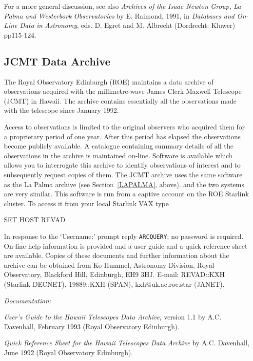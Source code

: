 \documentclass[twoside,11pt,nolof]{starlink}
\begin{document}
For a more general discussion, see also \textit{Archives of the Isaac
Newton Group, La Palma and Westerbork Observatories} by E. Raimond,
1991, in \textit{Databases and On-Line Data in Astronomy}, eds. D. Egret
and M. Albrecht (Dordrecht: Kluwer) pp115-124.

\subsection{JCMT Data Archive}

The Royal Observatory Edinburgh (ROE) maintains a data archive of
observations acquired with the millimetre-wave James Clerk Maxwell
Telescope (JCMT) in Hawaii. The archive contains essentially all the
observations made with the telescope since January 1992.

Access to observations is limited to the original observers who acquired
them for a proprietary period of one year. After this period has
elapsed the observations become publicly available. A catalogue
containing summary details of all the observations in the archive is
maintained on-line. Software is available which allows you to
interrogate this archive to identify observations of interest and to
subsequently request copies of them. The JCMT archive uses the same
software as the La Palma archive (see Section~\ref{LAPALMA}, above),
and the two systems are very similar. This software is run from a
captive account on the ROE Starlink cluster. To access it from your
local Starlink VAX type

\begin{terminalv}
    SET  HOST  REVAD
\end{terminalv}

In response to the `Username:' prompt reply \verb-ARCQUERY-; no password
is required. On-line help information is provided and a user guide and
a quick reference sheet are available. Copies of these documents and
further information about the archive can be obtained from Ko Hummel,
Astronomy Division, Royal Observatory, Blackford Hill, Edinburgh, EH9
3HJ. E-mail: REVAD::KXH (Starlink DECNET), 19889::KXH (SPAN),
kxh@uk.ac.roe.star (JANET).

\textit{Documentation:}

\textit{User's Guide to the Hawaii Telescopes Data Archive}, version 1.1
by A.C. Davenhall, February 1993 (Royal Observatory Edinburgh).

\textit{Quick Reference Sheet for the Hawaii Telescopes Data Archive} by
A.C. Davenhall, June 1992 (Royal Observatory Edinburgh).
\end{document}
